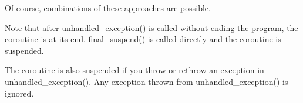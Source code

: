 Of course, combinations of these approaches are possible.

Note that after unhandled\_exception() is called without ending the program, the coroutine is at its end. final\_suspend() is called directly and the coroutine is suspended.

The coroutine is also suspended if you throw or rethrow an exception in unhandled\_exception(). Any exception thrown from unhandled\_exception() is ignored.









































